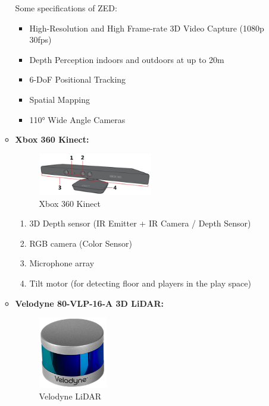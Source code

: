 \documentclass[12pt]{article}
\begin{document}
\begin{itemize}
\begin{itemize}
                Some specifications of ZED: 

                \begin{itemize}
                    \item High-Resolution and High Frame-rate 3D Video Capture (1080p 30fps) 
                    \item Depth Perception indoors and outdoors at up to 20m 
                    \item 6-DoF Positional Tracking 
                    \item Spatial Mapping 
                    \item 110° Wide Angle Cameras 
                \end{itemize}

                \item \textbf{Xbox 360 Kinect:} \\
                \begin{figure}[H]
                    \centering
                    \includegraphics[width=0.5\textwidth]{XBoxKinect.png}
                    \caption{Xbox 360 Kinect~\cite{XboxKinect}}
                \end{figure}

                \begin{enumerate}
                    \item 3D Depth sensor (IR Emitter + IR Camera / Depth Sensor) 
                    \item RGB camera (Color Sensor) 
                    \item Microphone array 
                    \item Tilt motor (for detecting floor and players in the play space) 
                \end{enumerate}

                \item \textbf{Velodyne 80-VLP-16-A 3D LiDAR:} \\
                \begin{figure}[H]
                    \centering
                    \includegraphics[width=0.3\textwidth]{LiDAR.png}
                    \caption{Velodyne LiDAR}
                \end{figure}


\end{itemize}
\end{itemize}
\end{document}

